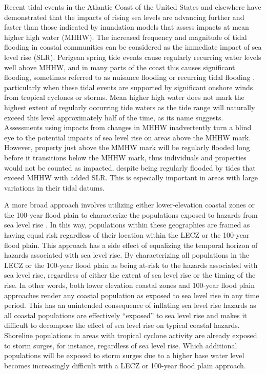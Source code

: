 \documentclass[12pt,]{article}
\begin{document}
Recent tidal events in the Atlantic Coast of the United States and
elsewhere
\citep{carbognin2010global, spanger2014encroaching, dahl2017sea} have
demonstrated that the impacts of rising sea levels are advancing further
and faster than those indicated by inundation models that assess impacts
at mean higher high water (MHHW). The increased frequency and magnitude
of tidal flooding in coastal communities can be considered as the
immediate impact of sea level rise (SLR). Perigean spring tide events
cause regularly recurring water levels well above MHHW, and in many
parts of the coast this causes significant flooding, sometimes referred
to as nuisance flooding or recurring tidal flooding
\citep{fennessey2001changes}, particularly when these tidal events are
supported by significant onshore winds from tropical cyclones or storms.
Mean higher high water does not mark the highest extent of regularly
occurring tide waters as the tide range will naturally exceed this level
approximately half of the time, as its name suggests. Assessments using
impacts from changes in MHHW inadvertently turn a blind eye to the
potential impacts of sea level rise on areas above the MHHW mark.
However, property just above the MMHW mark will be regularly flooded
long before it transitions below the MHHW mark, thus individuals and
properties would not be counted as impacted, despite being regularly
flooded by tides that exceed MHHW with added SLR. This is especially
important in areas with large variations in their tidal datums.

A more broad approach involves utilizing either lower-elevation coastal
zones or the 100-year flood plain to characterize the populations
exposed to hazards from sea level rise
\citep{hallegatte2011assessing, neumann2015future}. In this way,
populations within these geographies are framed as having equal risk
regardless of their location within the LECZ or the 100-year flood
plain. This approach has a side effect of equalizing the temporal
horizon of hazards associated with sea level rise. By characterizing all
populations in the LECZ or the 100-year flood plain as being at-risk to
the hazards associated with sea level rise, regardless of either the
extent of sea level rise or the timing of the rise. In other words, both
lower elevation coastal zones and 100-year flood plain approaches render
any coastal population as exposed to sea level rise in any time period.
This has an unintended consequence of inflating sea level rise hazards
as all coastal populations are effectively ``exposed'' to sea level rise
and makes it difficult to decompose the effect of sea level rise on
typical coastal hazards. Shoreline populations in areas with tropical
cyclone activity are already exposed to storm surges, for instance,
regardless of sea level rise. Which additional populations will be
exposed to storm surges due to a higher base water level becomes
increasingly difficult with a LECZ or 100-year flood plain approach.
\end{document}
